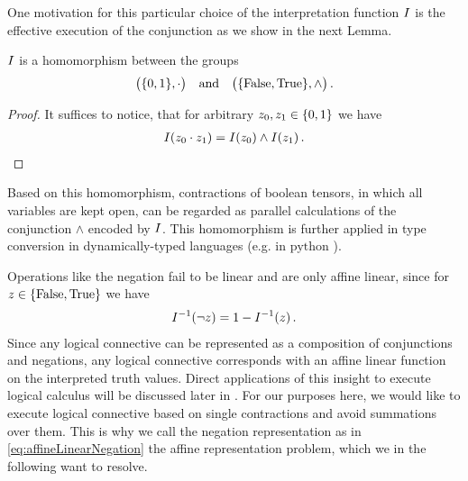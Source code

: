 One motivation for this particular choice of the interpretation function $I$ is the effective execution of the conjunction as we show in the next Lemma.

\begin{lemma}
	$I$ is a homomorphism between the groups
	\begin{align*}
		\big(\{0,1\},\cdot\big)  \quad \text{and} \quad \big(\{\mathrm{False},\mathrm{True}\},\land\big) \, .
	\end{align*}
\end{lemma}
\begin{proof}
	It suffices to notice, that for arbitrary $z_{0},z_{1}\in\{0,1\}$ we have
	\begin{align*}
		I(z_{0} \cdot z_{1})
		= I(z_{0}) \land I(z_{1})  \, .
	\end{align*}
\end{proof}
	
Based on this homomorphism, contractions of boolean tensors, in which all variables are kept open, can be regarded as parallel calculations of the conjunction $\land$ encoded by $I$.
This homomorphism is further applied in type conversion in dynamically-typed languages (e.g. in $\mathrm{python}$ \cite{python_software_foundation_python_2025}).

Operations like the negation fail to be linear and are only affine linear, since for $z\in\{\mathrm{False},\mathrm{True}\}$ we have
\begin{align}\label{eq:affineLinearNegation}
 	I^{-1}(\lnot z) = 1 - I^{-1}(z)  \, .
\end{align}
Since any logical connective can be represented as a composition of conjunctions and negations, any logical connective corresponds with an affine linear function on the interpreted truth values.
Direct applications of this insight to execute logical calculus will be discussed later in .
For our purposes here, we would like to execute logical connective based on single contractions and avoid summations over them.
This is why we call the negation representation as in \eqref{eq:affineLinearNegation} the affine representation problem, which we in the following want to resolve.

